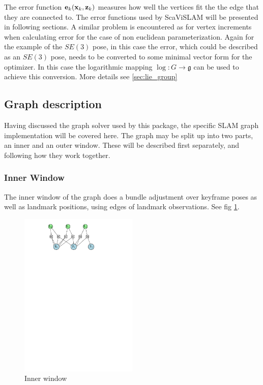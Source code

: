 The error function $\mathbf e_k(\mathbf x_k, \mathbf z_k)$ measures how well the vertices fit the the edge that they are connected to.  The error functions used by ScaViSLAM will be presented in following sections. A similar problem is encountered as for vertex increments when calculating error for the case of non euclidean parameterization.  Again for the example of the $SE(3)$ pose, in this case the error, which could be described as an $SE(3)$ pose, needs to be converted to some minimal vector form for the optimizer.  In this case the  logarithmic mapping $\log\colon G \to \mathfrak g$ can be used to achieve this conversion. More details see \ref{sec:lie_group}


\subsection{Graph description}

Having discussed the graph solver used by this package, the specific SLAM graph implementation will be covered here.  The graph may be split up into two parts, an inner and an outer window.  These will be described first separately, and following how they work together.

\subsubsection{Inner Window}

The inner window of the graph does a bundle adjustment over keyframe poses as well as landmark positions, using edges of landmark observations.  See fig \ref{fig:inner_window}.

\begin{figure}[h!]
  \centering
    \includegraphics[width=0.5\textwidth]{chapters/images/inner_window}
  \caption{Inner window}
  \label{fig:inner_window}
\end{figure}

